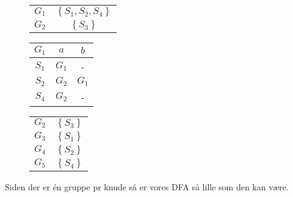 \documentclass[11pt,a4paper]{article}
\begin{document}
\begin{figure}[!ht]\label{fig:g1}
  \centering
  \begin{tabular}{c|c}
    $G_1$ & $\left\{S_1,S_2,S_4\right\}$\\
    $G_2$ & $\left\{S_3\right\}$
  \end{tabular}
\end{figure}
\begin{figure}[!ht]\label{fig:testg1}
  \centering
  \begin{tabular}{c|cc}
    $G_1$ & $a$ & $b$\\\hline
    $S_1$ & $G_1$ & - \\
    $S_2$ & $G_2$ & $G_1$ \\
    $S_4$ & $G_2$ & -
  \end{tabular}
\end{figure}
\begin{figure}[!ht]\label{fig:g1}
  \centering
  \begin{tabular}{c|c}
    $G_2$ & $\left\{S_3\right\}$\\
    $G_3$ & $\left\{S_1\right\}$\\
    $G_4$ & $\left\{S_2\right\}$\\
    $G_5$ & $\left\{S_4\right\}$\\
  \end{tabular}
\end{figure}
Siden der er én gruppe pr knude så er vores DFA så lille som den kan være.
\end{document}
